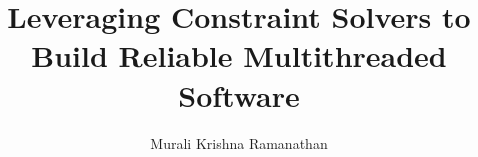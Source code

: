 \documentclass[EPiCempty]{easychair}
\begin{document}
\title{Leveraging Constraint Solvers to Build Reliable Multithreaded Software}
\author{Murali Krishna Ramanathan}


\maketitle
\begin{abstract}
\end{abstract}
\end{document}
